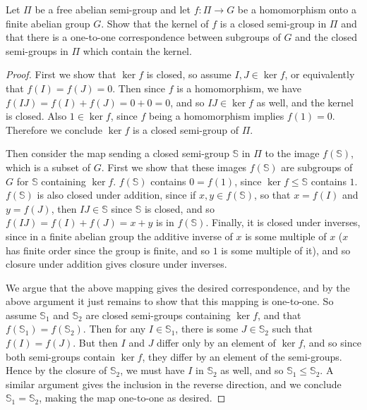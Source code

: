\documentclass[11pt]{article}
\begin{document}
Let $\Pi$ be a free abelian semi-group and let $f : \Pi \rightarrow G$ be a homomorphism onto a finite abelian group $G$.
Show that the kernel of $f$ is a closed semi-group in $\Pi$ and that there is a one-to-one correspondence between subgroups of $G$ and the closed semi-groups in $\Pi$ which contain the kernel.
\begin{proof}
  First we show that $\ker f$ is closed, so assume $I, J \in \ker f$, or equivalently that $f(I) = f(J) = 0$.
  Then since $f$ is a homomorphism, we have $f(IJ) = f(I) + f(J) = 0 + 0 = 0$, and so $IJ \in \ker f$ as well, and the kernel is closed.
  Also $1 \in \ker f$, since $f$ being a homomorphism implies $f(1) = 0$.
  Therefore we conclude $\ker f$ is a closed semi-group of $\Pi$.

  Then consider the map sending a closed semi-group $\mathbb{S}$ in $\Pi$ to the image $f(\mathbb{S})$, which is a subset of $G$.
  First we show that these images $f(\mathbb{S})$ are subgroups of $G$ for $\mathbb{S}$ containing $\ker f$.
  $f(\mathbb{S})$ contains $0 = f(1)$, since $\ker f \le \mathbb{S}$ contains $1$.
  $f(\mathbb{S})$ is also closed under addition, since if $x, y \in f(\mathbb{S})$, so that $x = f(I)$ and $y = f(J)$, then $IJ \in \mathbb{S}$ since $\mathbb{S}$ is closed, and so $f(IJ) = f(I) + f(J) = x + y$ is in $f(\mathbb{S})$.
  Finally, it is closed under inverses, since in a finite abelian group the additive inverse of $x$ is some multiple of $x$ ($x$ has finite order since the group is finite, and so $1$ is some multiple of it), and so closure under addition gives closure under inverses.
  
  We argue that the above mapping gives the desired correspondence, and by the above argument it just remains to show that this mapping is one-to-one.
  So assume $\mathbb{S}_1$ and $\mathbb{S}_2$ are closed semi-groups containing $\ker f$, and that $f(\mathbb{S}_1) = f(\mathbb{S}_2)$.
  Then for any $I \in \mathbb{S}_1$, there is some $J \in \mathbb{S}_2$ such that $f(I) = f(J)$.
  But then $I$ and $J$ differ only by an element of $\ker f$, and so since both semi-groups contain $\ker f$, they differ by an element of the semi-groups.
  Hence by the closure of $\mathbb{S}_2$, we must have $I$ in $\mathbb{S}_2$ as well, and so $\mathbb{S}_1 \le \mathbb{S}_2$.
  A similar argument gives the inclusion in the reverse direction, and we conclude $\mathbb{S}_1 = \mathbb{S}_2$, making the map one-to-one as desired.  
\end{proof}
\end{document}
